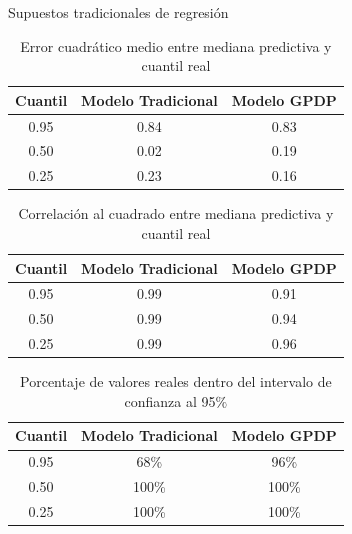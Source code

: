 \documentclass{beamer}
\begin{document}
\begin{frame}{Supuestos tradicionales de regresi\'on}

\begin{scriptsize}

\begin{table}[H]
    \centering
    \caption{Error cuadr\'atico medio entre mediana predictiva y cuantil real}
    \begin{tabular}{ccc}
    \hline
    Cuantil & Modelo Tradicional & Modelo GPDP \\ 
    \hline
    0.95 & 0.84 & 0.83 \\ 
    0.50 & 0.02 & 0.19 \\ 
    0.25 & 0.23 & 0.16 \\ 
    \hline
    \end{tabular}
\end{table}
\begin{table}[H]
    \centering
    \caption{Correlaci\'on al cuadrado entre mediana predictiva y cuantil real} 
    \begin{tabular}{ccc}
    \hline
    Cuantil & Modelo Tradicional & Modelo GPDP \\ 
    \hline
    0.95 & 0.99 & 0.91 \\ 
    0.50 & 0.99 & 0.94 \\ 
    0.25 & 0.99 & 0.96 \\ 
    \hline
    \end{tabular}
\end{table}

\begin{table}[H]
    \centering
    \caption{Porcentaje de valores reales dentro del intervalo de confianza al 95$\%$} 
    \begin{tabular}{ccc}
    \hline
    Cuantil & Modelo Tradicional & Modelo GPDP \\ 
    \hline
    0.95 & 68\% & 96\% \\ 
    0.50 & 100\% & 100\% \\ 
    0.25 & 100\% & 100\% \\ 
    \hline
    \end{tabular}
\end{table}

\end{scriptsize}
\end{frame}
\end{document}
